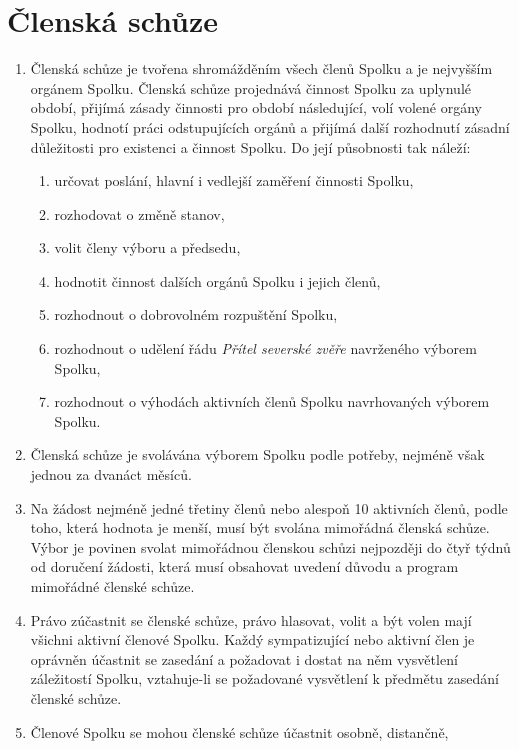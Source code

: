 \documentclass[11pt,a4paper]{article}
\begin{document}
\section{Členská schůze}
\begin{enumerate}[itemsep=0pt]
    \item Členská schůze je tvořena shromážděním všech členů Spolku a je 
    nejvyšším orgánem Spolku. Členská schůze projednává činnost Spolku 
    za uplynulé období, přijímá zásady činnosti pro období následující, 
    volí volené orgány Spolku, hodnotí práci odstupujících orgánů a přijímá 
    další rozhodnutí zásadní důležitosti pro existenci a činnost Spolku. 
    Do její působnosti tak náleží: 
    \begin{enumerate}[itemsep=0pt,topsep=0pt]
        \item určovat poslání, hlavní i vedlejší zaměření činnosti Spolku,
        \item rozhodovat o změně stanov,
        \item volit členy výboru a předsedu,
        \item hodnotit činnost dalších orgánů Spolku i jejich členů,
        \item rozhodnout o dobrovolném rozpuštění Spolku,
        \item rozhodnout o udělení řádu \textit{Přítel severské zvěře} navrženého výborem Spolku,
        \item rozhodnout o výhodách aktivních členů Spolku navrhovaných výborem Spolku. 
    \end{enumerate}
    \item Členská schůze je svolávána výborem Spolku podle potřeby, nejméně 
    však jednou za dvanáct měsíců.
    \item Na žádost nejméně jedné třetiny členů nebo alespoň 10 aktivních členů, podle toho, která hodnota je menší, musí být svolána mimořádná 
    členská schůze. Výbor je povinen svolat mimořádnou členskou schůzi 
    nejpozději do čtyř týdnů od doručení žádosti, která musí obsahovat uvedení 
    důvodu a program mimořádné členské schůze.
    \item Právo zúčastnit se členské schůze, právo hlasovat, volit a být volen 
    mají všichni aktivní členové Spolku. Každý sympatizující nebo aktivní člen 
    je oprávněn účastnit se zasedání a požadovat i dostat na něm vysvětlení 
    záležitostí Spolku, vztahuje-li se požadované vysvětlení k předmětu zasedání
    členské schůze.
    \item Členové Spolku se mohou členské schůze účastnit osobně, distančně,

\end{enumerate}
\end{document}
